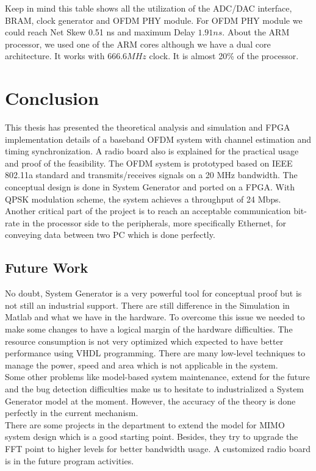 Keep in mind this table shows all the utilization of the ADC/DAC interface, BRAM, clock generator and OFDM PHY module. For OFDM PHY module we could reach Net Skew 0.51 ns and maximum  Delay $1.91 ns$. About the ARM processor, we used one of the ARM cores although we have a dual core architecture. It works with $666.6 MHz$ clock. It is almost 20\% of the processor.\\

\section{Conclusion}

This thesis has presented the theoretical analysis and simulation and  FPGA implementation details of a baseband OFDM system with channel estimation and timing synchronization. A radio board also is explained for the practical usage and proof of the feasibility. The OFDM system is prototyped based on IEEE 802.11a standard and transmits/receives signals on a 20 MHz bandwidth. The conceptual design is done in System Generator and ported on a FPGA. With QPSK modulation scheme, the system achieves a throughput of 24 Mbps.\\
Another critical part of the project is to reach an acceptable communication bit-rate in the processor side to the peripherals, more specifically Ethernet, for conveying data between two PC which is done perfectly.\\

\subsection{Future Work}
No doubt, System Generator is a very powerful tool for conceptual proof but is not still an industrial support. There are still difference in the Simulation in Matlab and what we have in the hardware. To overcome this issue we needed to make some changes to have a logical margin of the hardware difficulties. The resource consumption is not very optimized which expected to have better performance using VHDL programming. There are many low-level techniques to manage the power, speed and area which is not applicable in the system.\\
Some other problems like model-based system maintenance, extend for the future and the bug detection difficulties make us to hesitate to industrialized a System Generator model at the moment. However, the accuracy of the theory is done perfectly in the current mechanism.\\
There are some projects in the department to extend the model for MIMO system design which is a good starting point. Besides, they try to upgrade the FFT point to higher levels for better bandwidth usage. A customized radio board is in the future program activities.\\